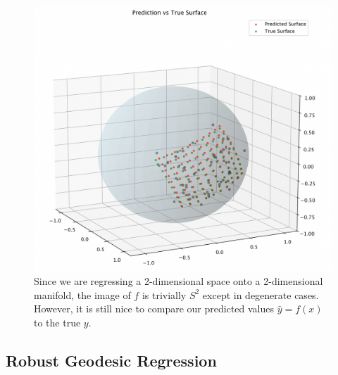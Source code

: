 \begin{example}
    \begin{figure}[H]
      \centering 
      \includegraphics[scale=0.3]{img/multi_geodesic_surface.png}
      \caption{Since we are regressing a 2-dimensional space onto a 2-dimensional manifold, the image of $f$ is trivially $S^2$ except in degenerate cases. However, it is still nice to compare our predicted values $\hat{y} = f(x)$ to the true $y$.} 
    \end{figure}
  \end{example}

\subsection{Robust Geodesic Regression} 
